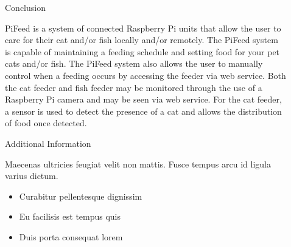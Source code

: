 \documentclass[final]{beamer}
\newlength{\sepwid}
\newlength{\onecolwid}
\newlength{\twocolwid}
\begin{document}
\begin{frame}[t]
\begin{columns}[t]
\begin{column}{\twocolwid}
\begin{columns}[t,totalwidth=\twocolwid]
\begin{column}{\onecolwid}
\end{column} %

\end{columns} %

\end{column} %

\begin{column}{\sepwid}\end{column} %

\begin{column}{\onecolwid} %


\begin{block}{Conclusion}

PiFeed is a system of connected Raspberry Pi units that allow the user to care
for their cat and/or fish locally and/or remotely. The PiFeed system is capable
of maintaining a feeding schedule and setting food for your pet cats and/or
fish. The PiFeed system also allows the user to manually control when a feeding
occurs by accessing the feeder via web service. Both the cat feeder and fish
feeder may be monitored through the use of a Raspberry Pi camera and may be seen
via web service. For the cat feeder, a sensor is used to detect the presence of
a cat and allows the distribution of food once detected.

\end{block}


\begin{block}{Additional Information}

Maecenas ultricies feugiat velit non mattis. Fusce tempus arcu id ligula varius dictum. 
\begin{itemize}
\item Curabitur pellentesque dignissim
\item Eu facilisis est tempus quis
\item Duis porta consequat lorem
\end{itemize}

\end{block}


\end{column}
\end{columns}
\end{frame}
\end{document}
